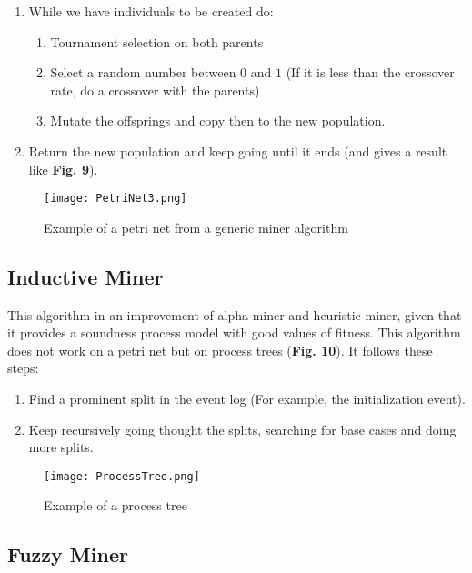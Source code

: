 \documentclass[conference]{IEEEtran}
\begin{document}
\begin{enumerate}
\begin{enumerate}
        \item While we have individuals to be created do:
        \begin{enumerate}
            \item Tournament selection on both parents
            \item Select a random number between $0$ and $1$ (If it is less than the crossover rate, do a crossover with the parents)
            \item 	Mutate the offsprings and copy then to the new population.
        \end{enumerate}
        \item Return the new population and keep going until it ends (and gives a result like \textbf{Fig. 9}).
    \end{enumerate}
\end{enumerate}

\begin{figure}[htp]
    \centering
    \texttt{[image: PetriNet3.png]}
    \caption{Example of a petri net from a generic miner algorithm}
    \label{fig:modelDrawn}
\end{figure}

\subsection{Inductive Miner}

This algorithm in an improvement of alpha miner and heuristic miner, given that it provides a soundness process model with good values of fitness.
This algorithm does not work on a petri net but on process trees (\textbf{Fig. 10}). It follows these steps:
\begin{enumerate}
    \item Find a prominent split in the event log (For example, the initialization event).
    \item Keep recursively going thought the splits, searching for base cases and doing more splits.
\end{enumerate}

\begin{figure}[htp]
    \centering
    \texttt{[image: ProcessTree.png]}
    \caption{Example of a process tree}
    \label{fig:modelDrawn}
\end{figure}

\subsection{Fuzzy Miner}
\end{document}
